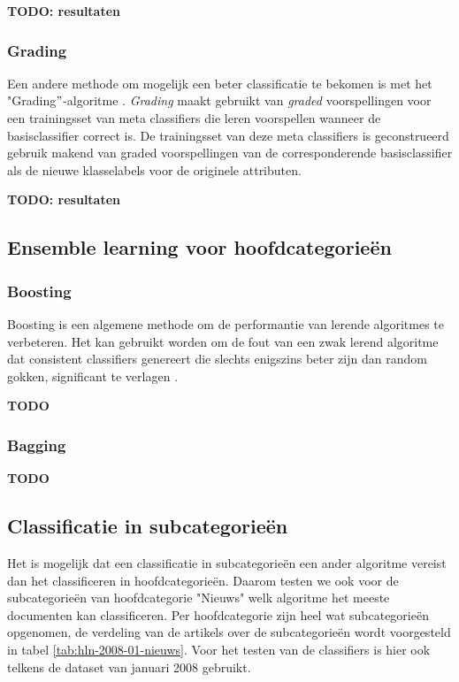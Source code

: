 \textbf{TODO: resultaten}

\subsubsection{Grading}\label{grading}
Een andere methode om mogelijk een beter classificatie te bekomen is met het "Grading$"$-algoritme \cite{SEEWALD}. \textit{Grading} maakt gebruikt van \textit{graded} voorspellingen voor een trainingsset van meta classifiers die leren voorspellen wanneer de basisclassifier correct is. De trainingsset van deze meta classifiers is geconstrueerd gebruik makend van graded voorspellingen van de corresponderende basisclassifier als de nieuwe klasselabels voor de originele attributen. 

\textbf{TODO: resultaten}
\subsection{Ensemble learning voor hoofdcategorie\"en}
\subsubsection{Boosting}
Boosting is een algemene methode om de performantie van lerende algoritmes te verbeteren. Het kan gebruikt worden om de fout van een zwak lerend algoritme dat consistent classifiers genereert die slechts enigszins beter zijn dan random gokken, significant te verlagen \cite{Freund1996}.


\textbf{TODO}

\subsubsection{Bagging}
\textbf{TODO}
 

\subsection{Classificatie in subcategorie\"en}
Het is mogelijk dat een classificatie in subcategorie\"en een ander algoritme vereist dan het classificeren in hoofdcategorie\"en. Daarom testen we ook voor de subcategorie\"en van hoofdcategorie "Nieuws" welk algoritme het meeste documenten kan classificeren. Per hoofdcategorie zijn heel wat subcategorie\"en opgenomen, de verdeling van de artikels over de subcategorie\"en wordt voorgesteld in tabel \ref{tab:hln-2008-01-nieuws}. Voor het testen van de classifiers is hier ook telkens de dataset van januari 2008 gebruikt. 

